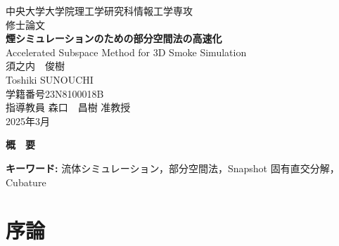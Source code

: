 \documentclass[a4j,12pt]{jreport}
\begin{document}
\thispagestyle{empty}
\begin{center}
\begin{Large}
\vspace*{0.7cm}
{\large 中央大学大学院理工学研究科情報工学専攻\\修士論文}\\
\vspace*{2.5cm}
{\LARGE\bf 煙シミュレーションのための部分空間法の高速化}\\
\vspace*{0.7cm}
{\sf Accelerated Subspace Method for 3D Smoke Simulation}\\
\vspace*{6.5cm}
須之内　俊樹\\
Toshiki SUNOUCHI\\
学籍番号\hspace*{1zw}23N8100018B\\
\vspace*{2.5cm}
指導教員\hspace*{1zw} 森口　昌樹 准教授\\
\vspace*{2.5cm}
2025年3月\\
\end{Large}
\end{center}


\newpage
\renewcommand{\baselinestretch}{1.25} \selectfont
{}


\begin{center} {\large \bf{概　要}} \end{center}

\vspace{1zw} \noindent
{\bf キーワード: }流体シミュレーション，部分空間法，Snapshot 固有直交分解，Cubature

\tableofcontents


\newpage
{}

\chapter{序論} \label{chapter:1}

\end{document}
